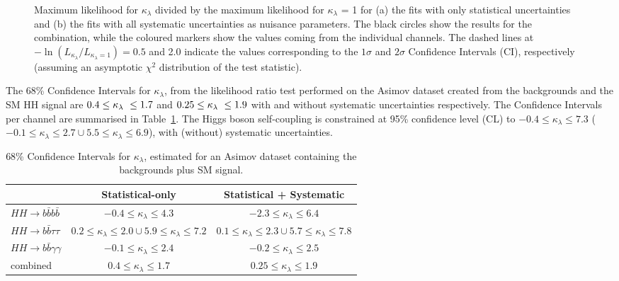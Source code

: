 \begin{figure}[!htb]
\centering 
{} 
\caption{Maximum likelihood for $\kappa_{\lambda}$ divided by the maximum likelihood for $\kappa_{\lambda}$ = 1 for (a) the fits with only statistical uncertainties and (b) the fits with all systematic uncertainties as nuisance parameters. The black circles show the results for the combination, while the coloured markers show the values coming from the individual channels. The dashed lines at $-\ln\left(L_{\kappa_{\lambda}}/L_{\kappa_{\lambda}=1}\right) = 0.5$ and 2.0 indicate the values corresponding to the $1\sigma$ and $2\sigma$ Confidence Intervals (CI), respectively (assuming an asymptotic $\chi^2$ distribution of the test statistic).} 
\label{fig:ATLAS_HH_comb} 
\end{figure}

The 68\% Confidence Intervals for $\kappa_{\lambda}$, from the likelihood ratio test performed on the Asimov dataset created from the backgrounds and the SM HH signal are $0.4 \leq \kappa_{\lambda}\ \leq 1.7$ and $0.25 \leq \kappa_{\lambda}\ \leq 1.9$ with and without systematic uncertainties respectively. The Confidence Intervals per channel are summarised in Table~\ref{tab:ATLAS_HH_kappalambda}. 
The Higgs boson self-coupling is constrained at 95\% confidence level (CL) to $-0.4\leq \kappa_{\lambda} \leq7.3$ ($-0.1\leq \kappa_{\lambda} \leq2.7\cup5.5\leq \kappa_{\lambda} \leq6.9$), with (without) systematic uncertainties.


\begin{table}[htb!]
\begin{center}
\begin{tabular}{lcc} \toprule
 & \textbf{Statistical-only} & \textbf{Statistical + Systematic}\\
\hline
$HH \rightarrow b\bar{b}b\bar{b}$ & $-0.4 \leq \kappa_{\lambda} \leq 4.3$ & $-2.3 \leq \kappa_{\lambda} \leq 6.4$ \\
$HH \rightarrow b\bar{b}\tau\tau$ &  $0.2 \leq \kappa_{\lambda} \leq 2.0 \cup 5.9 \leq \kappa_{\lambda} \leq 7.2$ & $0.1 \leq \kappa_{\lambda} \leq 2.3 \cup 5.7 \leq \kappa_{\lambda} \leq 7.8$ \\
$HH \rightarrow b\bar{b}\gamma\gamma$ &  $-0.1 \leq \kappa_{\lambda} \leq 2.4$ & $-0.2 \leq \kappa_{\lambda} \leq 2.5$ \\
combined &   $0.4 \leq \kappa_{\lambda} \leq 1.7$ & $0.25 \leq \kappa_{\lambda} \leq 1.9$ \\
\bottomrule
\end{tabular}
\end{center}
\caption{68\% Confidence Intervals for $\kappa_{\lambda}$, estimated for an Asimov dataset containing the backgrounds plus SM signal.}
\label{tab:ATLAS_HH_kappalambda}
\end{table}



